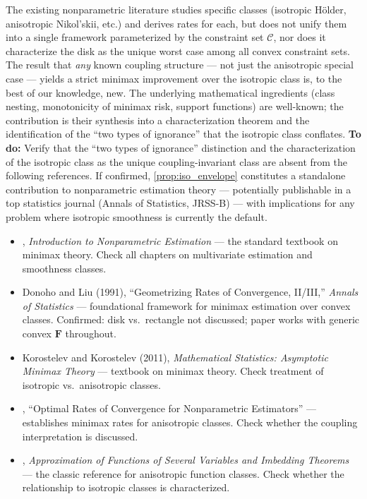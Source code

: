 \begin{itemize}
	The existing nonparametric literature studies specific classes (isotropic Hölder, anisotropic Nikol'skii, etc.) and derives rates for each, but does not unify them into a single framework parameterized by the constraint set $\mathcal{C}$, nor does it characterize the disk as the unique worst case among all convex constraint sets.
	The result that \emph{any} known coupling structure --- not just the anisotropic special case --- yields a strict minimax improvement over the isotropic class is, to the best of our knowledge, new.
	The underlying mathematical ingredients (class nesting, monotonicity of minimax risk, support functions) are well-known; the contribution is their synthesis into a characterization theorem and the identification of the ``two types of ignorance'' that the isotropic class conflates.
	\textbf{To do:} Verify that the ``two types of ignorance'' distinction and the characterization of the isotropic class as the unique coupling-invariant class are absent from the following references.
	If confirmed, \cref{prop:iso_envelope} constitutes a standalone contribution to nonparametric estimation theory --- potentially publishable in a top statistics journal (Annals of Statistics, JRSS-B) --- with implications for any problem where isotropic smoothness is currently the default.
	\begin{itemize}
		\item \textcite{tsybakov_introduction_2009}, \emph{Introduction to Nonparametric Estimation} --- the standard textbook on minimax theory. Check all chapters on multivariate estimation and smoothness classes.
		\item Donoho and Liu (1991), ``Geometrizing Rates of Convergence, II/III,'' \emph{Annals of Statistics} --- foundational framework for minimax estimation over convex classes. Confirmed: disk vs.\ rectangle not discussed; paper works with generic convex $\mathbf{F}$ throughout.
		\item Korostelev and Korostelev (2011), \emph{Mathematical Statistics: Asymptotic Minimax Theory} --- textbook on minimax theory. Check treatment of isotropic vs.\ anisotropic classes.
		\item \textcite{stone_optimal_1980}, ``Optimal Rates of Convergence for Nonparametric Estimators'' --- establishes minimax rates for anisotropic classes. Check whether the coupling interpretation is discussed.
		\item \textcite{nikolskii_approximation_1975}, \emph{Approximation of Functions of Several Variables and Imbedding Theorems} --- the classic reference for anisotropic function classes. Check whether the relationship to isotropic classes is characterized.

\end{itemize}
\end{itemize}
